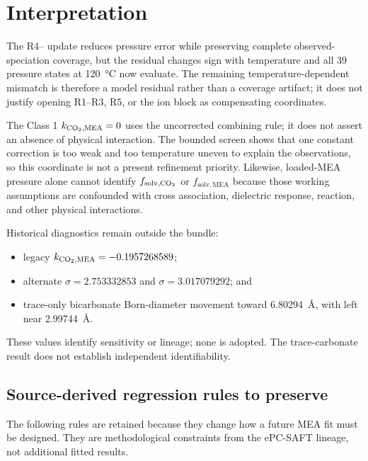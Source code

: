 \documentclass[10pt,oneside]{scrartcl}
\begin{document}
\section{Interpretation}

The R4-- update reduces pressure error while preserving complete observed-
speciation coverage, but the residual changes sign with temperature and
all 39 pressure states at \SI{120}{\celsius} now evaluate. The remaining
temperature-dependent mismatch is therefore a model residual rather than a
coverage artifact; it does not justify opening R1--R3, R5, or the ion block as
compensating coordinates.

The Class 1 $k_{\ce{CO2},\mathrm{MEA}}=0$ uses the uncorrected combining rule;
it does not assert an absence of physical interaction. The bounded screen shows
that one constant correction is too weak and too temperature uneven to explain
the observations, so this coordinate is not a present refinement priority.
Likewise, loaded-MEA
pressure alone cannot identify $f_{\mathrm{solv},\ce{CO2}}$ or
$f_{\mathrm{solv},\mathrm{MEA}}$ because those working assumptions are confounded with
cross association, dielectric response, reaction, and other physical
interactions.

Historical diagnostics remain outside the bundle:
\begin{itemize}
\item legacy $k_{\ce{CO2},\mathrm{MEA}}=-0.1957268589$;
\item alternate  $\sigma=2.753332853$ and 
  $\sigma=3.017079292$; and
\item trace-only bicarbonate Born-diameter movement toward
  \SI{6.80294}{\angstrom}, with  left near
  \SI{2.99744}{\angstrom}.
\end{itemize}
These values identify sensitivity or lineage; none is adopted. The
trace-carbonate result does not establish independent identifiability.

\subsection{Source-derived regression rules to preserve}
\label{sec:regression-rules}

The following rules are retained because they change how a future MEA fit must
be designed. They are methodological constraints from the ePC-SAFT lineage,
not additional fitted results.
\end{document}
